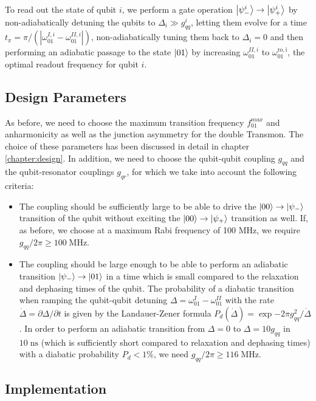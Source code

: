 To read out the state of qubit $i$, we perform a gate operation $\left| \psi_-^i \right>\to\left| \psi_+^i \right>$ by non-adiabatically detuning the qubits to $\Delta_i\gg g_{qq}^i$, letting them evolve for a time $t_\pi=\pi/(|\omega_{01}^{I,i}-\omega_{01}^{II,i}|)$, non-adiabatically tuning them back to $\Delta_i = 0$ and then performing an adiabatic passage to the state $\left| 01 \right>$ by increasing $\omega_{01}^{II,i}$ to $\omega_{01}^\mathrm{ro,i}$, the optimal readout frequency for qubit $i$.

\subsection{Design Parameters}

As before, we need to choose the maximum transition frequency $f_{01}^{max}$ and anharmonicity as well as the junction asymmetry for the double Transmon. The choice of these parameters has been discussed in detail in chapter \ref{chapter:design}. In addition, we need to choose the qubit-qubit coupling $g_{qq}$ and the qubit-resonator couplings $g_{qr}$, for which we take into account the following criteria:

\begin{itemize}
\item The coupling should be sufficiently large to be able to drive the $\left| 00 \right>\to\left| \psi_- \right>$ transition of the qubit without exciting the $\left| 00 \right>\to \left| \psi_+ \right>$ transition as well. If, as before, we choose at a maximum Rabi frequency of 100 MHz, we require $g_{qq}/2\pi\ge 100\;\mathrm{MHz}$.
\item The coupling should be large enough to be able to perform an adiabatic transition $\left| \psi_- \right>\to\left| 01 \right>$ in a time which is small compared to the relaxation and dephasing times of the qubit. The probability of a diabatic transition when ramping the qubit-qubit detuning $\Delta=\omega_{01}^I-\omega_{01}^{II}$ with the rate $\dot{\Delta}=\partial \Delta/\partial t$ is given by the Landauer-Zener formula $P_d(\dot{\Delta})=\exp{-2\pi g_{qq}^2/\dot{\Delta}}$. In order to perform an adiabatic transition from $\Delta=0$ to $\Delta = 10g_{qq}$ in $10\;\mathrm{ns}$ (which is sufficiently short compared to relaxation and dephasing times) with a diabatic probability $P_d<1\%$, we need $g_{qq}/2\pi\ge 116\;\mathrm{MHz}$. 
\end{itemize}

\subsection{Implementation}

